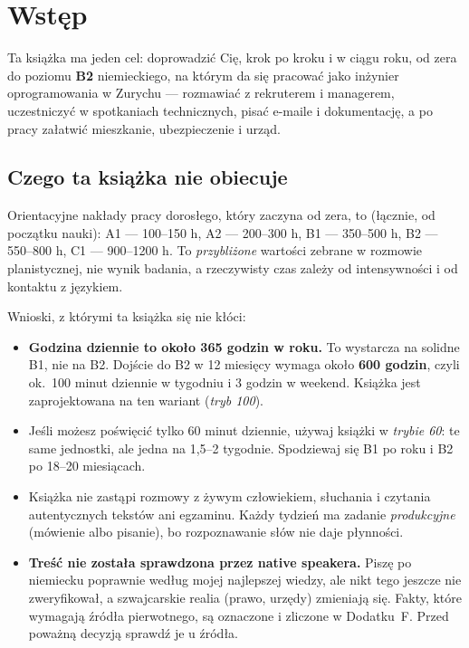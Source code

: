 \chapter*{Wstęp}

Ta książka ma jeden cel: doprowadzić Cię, krok po kroku i w ciągu roku, od zera do poziomu
\textbf{B2} niemieckiego, na którym da się pracować jako inżynier oprogramowania w Zurychu
--- rozmawiać z rekruterem i managerem, uczestniczyć w spotkaniach technicznych, pisać e-maile
i dokumentację, a po pracy załatwić mieszkanie, ubezpieczenie i urząd.

\section*{Czego ta książka nie obiecuje}

\begin{uwaga}
Orientacyjne nakłady pracy dorosłego, który zaczyna od zera, to (łącznie, od początku nauki):
A1 --- 100--150 h, A2 --- 200--300 h, B1 --- 350--500 h, B2 --- 550--800 h, C1 --- 900--1200 h.
To \emph{przybliżone} wartości zebrane w rozmowie planistycznej, nie wynik badania, a rzeczywisty
czas zależy od intensywności i od kontaktu z językiem.
\end{uwaga}

Wnioski, z którymi ta książka się nie kłóci:

\begin{itemize}
\item \textbf{Godzina dziennie to około 365 godzin w roku.} To wystarcza na solidne B1, nie na B2.
  Dojście do B2 w 12 miesięcy wymaga około \textbf{600 godzin}, czyli ok.\ 100 minut dziennie
  w tygodniu i 3 godzin w weekend. Książka jest zaprojektowana na ten wariant (\emph{tryb 100}).
\item Jeśli możesz poświęcić tylko 60 minut dziennie, używaj książki w \emph{trybie 60}: te same
  jednostki, ale jedna na 1,5--2 tygodnie. Spodziewaj się B1 po roku i B2 po 18--20 miesiącach.
\item Książka nie zastąpi rozmowy z żywym człowiekiem, słuchania i czytania autentycznych tekstów
  ani egzaminu. Każdy tydzień ma zadanie \emph{produkcyjne} (mówienie albo pisanie), bo
  rozpoznawanie słów nie daje płynności.
\item \textbf{Treść nie została sprawdzona przez native speakera.} Piszę po niemiecku poprawnie
  według mojej najlepszej wiedzy, ale nikt tego jeszcze nie zweryfikował, a szwajcarskie realia
  (prawo, urzędy) zmieniają się. Fakty, które wymagają źródła pierwotnego, są oznaczone
   i zliczone w Dodatku~F. Przed poważną decyzją sprawdź je u źródła.
\end{itemize}

